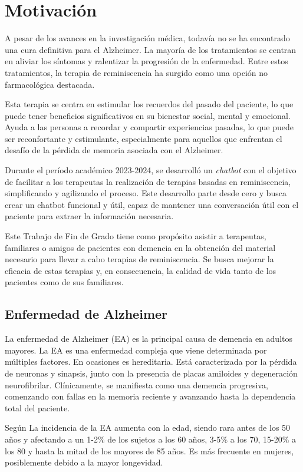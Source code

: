 \section{Motivación}

A pesar de los avances en la investigación médica, todavía no se ha encontrado una cura definitiva para el Alzheimer. La mayoría de los tratamientos se centran en aliviar los síntomas y ralentizar la progresión de la enfermedad. Entre estos tratamientos, la terapia de reminiscencia ha surgido como una opción no farmacológica destacada.

Esta terapia se centra en estimular los recuerdos del pasado del paciente, lo que puede tener beneficios significativos en su bienestar social, mental y emocional. Ayuda a las personas a recordar y compartir experiencias pasadas, lo que puede ser reconfortante y estimulante, especialmente para aquellos que enfrentan el desafío de la pérdida de memoria asociada con el Alzheimer.

Durante el período académico 2023-2024, se desarrolló un \textit{chatbot} con el objetivo de facilitar a los terapeutas la realización de terapias basadas en reminiscencia, simplificando y agilizando el proceso. Este desarrollo parte desde cero y busca crear un chatbot funcional y útil, capaz de mantener una conversación útil con el paciente para extraer la información necesaria.

Este Trabajo de Fin de Grado tiene como propósito asistir a terapeutas, familiares o amigos de pacientes con demencia en la obtención del material necesario para llevar a cabo terapias de reminiscencia. Se busca mejorar la eficacia de estas terapias y, en consecuencia, la calidad de vida tanto de los pacientes como de sus familiares. 

\subsection{Enfermedad de Alzheimer}
La enfermedad de Alzheimer (EA) es la principal causa de demencia en adultos mayores. La EA es una enfermedad compleja que viene determinada por múltiples factores. En ocasiones es hereditaria. Está caracterizada por la pérdida de neuronas y sinapsis, junto con la presencia de placas amiloides y degeneración neurofibrilar. Clínicamente, se manifiesta como una demencia progresiva, comenzando con fallas en la memoria reciente y avanzando hasta la dependencia total del paciente.

Según \cite{Donoso2003} La incidencia de la EA aumenta con la edad, siendo rara antes de los 50 años y afectando a un 1-2$\%$ de los sujetos a los 60 años, 3-5$\%$ a los 70, 15-20$\%$ a los 80 y hasta la mitad de los mayores de 85 años. Es más frecuente en mujeres, posiblemente debido a la mayor longevidad.


